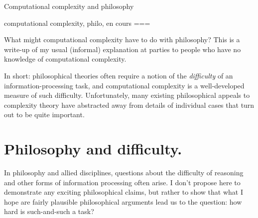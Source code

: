 Computational complexity and philosophy

computational complexity, philo, en cours
===

What might computational complexity have to do with philosophy? This is a write-up of my usual (informal) explanation at parties to people who have no knowledge of computational complexity.

In short: philosophical theories often require a notion of the \emph{difficulty} of an information-processing task, and computational complexity is a well-developed measure of such difficulty. Unfortunately, many existing philosophical appeals to complexity theory have abstracted away from details of individual cases that turn out to be quite important.

\section*{Philosophy and difficulty.}
In philosophy and allied disciplines, questions about the difficulty of reasoning and other forms of information processing often arise. I don’t propose here to demonstrate any exciting philosophical claims, but rather to show that what I hope are fairly plausible philosophical arguments lead us to the question: how hard is such-and-such a task?

